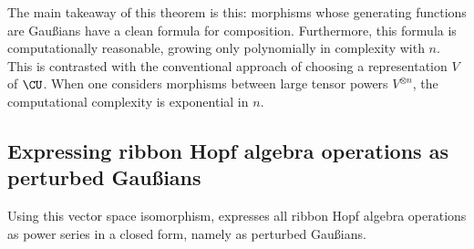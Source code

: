 The main takeaway of this theorem is this: morphisms whose generating functions
are Gaußians have a clean formula for composition. Furthermore, this formula is
computationally reasonable, growing only polynomially in complexity with $n$.
This is contrasted with the conventional approach of choosing a representation
$V$ of $\CU$. When one considers morphisms between large tensor powers
$V^{\otimes n}$, the computational complexity is exponential in $n$.

\subsection{Expressing ribbon Hopf algebra operations as perturbed Gaußians}

Using this vector space isomorphism, \cite{BV} expresses all ribbon Hopf algebra
operations as power series in a closed form, namely as perturbed Gaußians.

